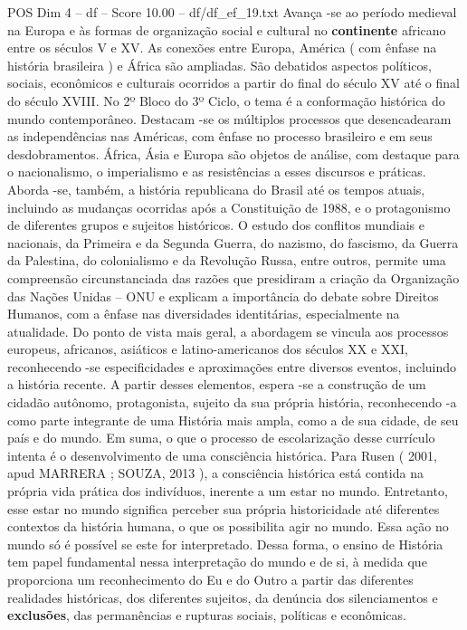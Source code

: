 \begin{textsample}{POS Dim 4 – df – Score 10.00 – df/df\_ef\_19.txt}
Avança -se ao período medieval na Europa e às formas de organização social e cultural no \textbf{continente} africano entre os séculos V e XV.
As conexões entre Europa, América ( com ênfase na história brasileira ) e África são ampliadas.
São debatidos aspectos políticos, sociais, econômicos e culturais ocorridos a partir do final do século XV até o final do século XVIII.
No 2º Bloco do 3º Ciclo, o tema é a conformação histórica do mundo contemporâneo.
Destacam -se os múltiplos processos que desencadearam as independências nas Américas, com ênfase no processo brasileiro e em seus desdobramentos.
África, Ásia e Europa são objetos de análise, com destaque para o nacionalismo, o imperialismo e as resistências a esses discursos e práticas.
Aborda -se, também, a história republicana do Brasil até os tempos atuais, incluindo as mudanças ocorridas após a Constituição de 1988, e o protagonismo de diferentes grupos e sujeitos históricos.
O estudo dos conflitos mundiais e nacionais, da Primeira e da Segunda Guerra, do nazismo, do fascismo, da Guerra da Palestina, do colonialismo e da Revolução Russa, entre outros, permite uma compreensão circunstanciada das razões que presidiram a criação da Organização das Nações Unidas – ONU e explicam a importância do debate sobre Direitos Humanos, com a ênfase nas diversidades identitárias, especialmente na atualidade.
Do ponto de vista mais geral, a abordagem se vincula aos processos europeus, africanos, asiáticos e latino-americanos dos séculos XX e XXI, reconhecendo -se especificidades e aproximações entre diversos eventos, incluindo a história recente.
A partir desses elementos, espera -se a construção de um cidadão autônomo, protagonista, sujeito da sua própria história, reconhecendo -a como parte integrante de uma História mais ampla, como a de sua cidade, de seu país e do mundo.
Em suma, o que o processo de escolarização desse currículo intenta é o desenvolvimento de uma consciência histórica.
Para Rusen ( 2001, apud MARRERA ; SOUZA, 2013 ), a consciência histórica está contida na própria vida prática dos indivíduos, inerente a um estar no mundo.
Entretanto, esse estar no mundo significa perceber sua própria historicidade até diferentes contextos da história humana, o que os possibilita agir no mundo.
Essa ação no mundo só é possível se este for interpretado.
Dessa forma, o ensino de História tem papel fundamental nessa interpretação do mundo e de si, à medida que proporciona um reconhecimento do Eu e do Outro a partir das diferentes realidades históricas, dos diferentes sujeitos, da denúncia dos silenciamentos e \textbf{exclusões}, das permanências e rupturas sociais, políticas e econômicas.

\end{textsample}

